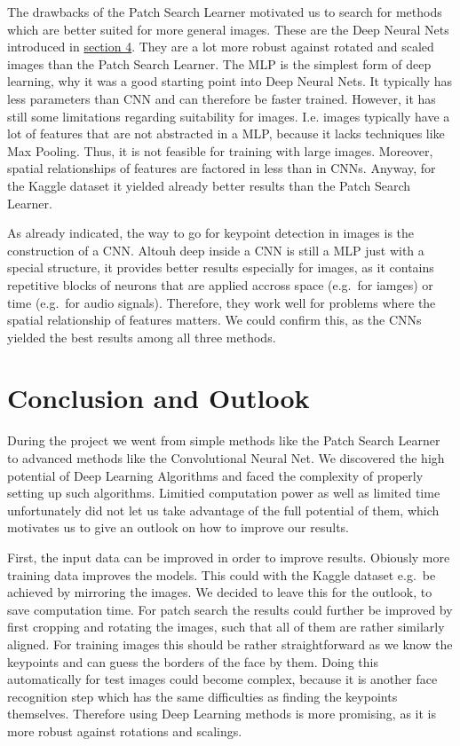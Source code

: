 \documentclass[]{article}
\begin{document}
The drawbacks of the Patch Search Learner motivated us to search for
methods which are better suited for more general images. These are the
Deep Neural Nets introduced in
\protect\hyperlink{deep-neural-nets}{section 4}. They are a lot more
robust against rotated and scaled images than the Patch Search Learner.
The MLP is the simplest form of deep learning, why it was a good
starting point into Deep Neural Nets. It typically has less parameters
than CNN and can therefore be faster trained. However, it has still some
limitations regarding suitability for images. I.e. images typically have
a lot of features that are not abstracted in a MLP, because it lacks
techniques like Max Pooling. Thus, it is not feasible for training with
large images. Moreover, spatial relationships of features are factored
in less than in CNNs. Anyway, for the Kaggle dataset it yielded already
better results than the Patch Search Learner.

As already indicated, the way to go for keypoint detection in images is
the construction of a CNN. Altouh deep inside a CNN is still a MLP just
with a special structure, it provides better results especially for
images, as it contains repetitive blocks of neurons that are applied
accross space (e.g.~for iamges) or time (e.g.~for audio signals).
Therefore, they work well for problems where the spatial relationship of
features matters. We could confirm this, as the CNNs yielded the best
results among all three methods.

\section{Conclusion and Outlook}\label{conclusion-and-outlook}

During the project we went from simple methods like the Patch Search
Learner to advanced methods like the Convolutional Neural Net. We
discovered the high potential of Deep Learning Algorithms and faced the
complexity of properly setting up such algorithms. Limitied computation
power as well as limited time unfortunately did not let us take
advantage of the full potential of them, which motivates us to give an
outlook on how to improve our results.

First, the input data can be improved in order to improve results.
Obiously more training data improves the models. This could with the
Kaggle dataset e.g.~be achieved by mirroring the images. We decided to
leave this for the outlook, to save computation time. For patch search
the results could further be improved by first cropping and rotating the
images, such that all of them are rather similarly aligned. For training
images this should be rather straightforward as we know the keypoints
and can guess the borders of the face by them. Doing this automatically
for test images could become complex, because it is another face
recognition step which has the same difficulties as finding the
keypoints themselves. Therefore using Deep Learning methods is more
promising, as it is more robust against rotations and scalings.
\end{document}
